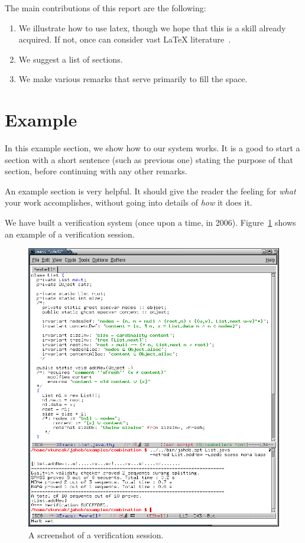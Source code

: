 \documentclass[a4paper,UKenglish,cleveref, autoref, thm-restate]{lipics-v2021}
\begin{document}
The main contributions of this report are the following:
\begin{enumerate}
\item We illustrate how to use latex, though we hope that this is a skill already acquired. If not, once can consider
  vast LaTeX literature~\cite{latexTutorial}.
\item We suggest a list of sections.
\item We make various remarks that serve primarily to fill the space.
\end{enumerate}

\section{Example}
\label{sec:example}

In this example section, we show how to our system works. It
is a good to start a section with a short sentence (such as
previous one) stating the purpose of that section, before
continuing with any other remarks.

An example section is very helpful. It should give the
reader the feeling for \emph{what} your work accomplishes,
without going into details of \emph{how} it does it.

We have built a verification system (once upon a time, in 2006). Figure~\ref{fig:session} shows an example of a verification session.
\begin{figure}
  \includegraphics[width=\textwidth]{screenshot.png}
  \caption{A screenshot of a verification session.\label{fig:session}}
\end{figure}
\end{document}

